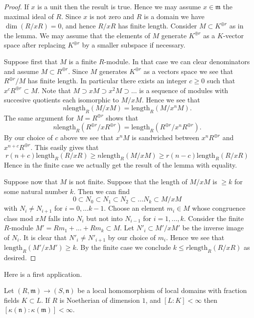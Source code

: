 \begin{proof}
If $x$ is a unit then the result is true. Hence we may assume
$x \in \mathfrak m$ the maximal ideal of $R$. Since $x$ is not
zero and $R$ is a domain we have $\dim(R/xR) = 0$, and hence
$R/xR$ has finite length. Consider $M \subset K^{\oplus r}$ as
in the lemma. We may assume that the elements of $M$ generate
$K^{\oplus r}$ as a $K$-vector space after replacing $K^{\oplus r}$
by a smaller subspace if necessary.

\medskip\noindent
Suppose first that $M$ is a finite $R$-module. In that case we can clear
denominators and assume $M \subset R^{\oplus r}$. Since
$M$ generates $K^{\oplus r}$ as a vectors space we see that
$R^{\oplus r}/M$ has finite length. In particular there exists
an integer $c \geq 0$ such that $x^cR^{\oplus r} \subset M$.
Note that $M \supset xM \supset x^2M \supset \ldots$ is a sequence of
modules with succesive quotients each isomorphic to $M/xM$. Hence
we see that
$$
n \text{length}_R(M/xM) = \text{length}_R(M/x^nM).
$$
The same argument for $M = R^{\oplus r}$ shows that
$$
n \text{length}_R(R^{\oplus r}/xR^{\oplus r}) =
\text{length}_R(R^{\oplus r}/x^nR^{\oplus r}).
$$
By our choice of $c$ above we see that $x^nM$ is sandwiched between
$x^n R^{\oplus r}$ and $x^{n + c}R^{\oplus r}$. This easily gives that
$$
r(n + c) \text{length}_R(R/xR)
\geq
n \text{length}_R(M/xM)
\geq
r (n - c) \text{length}_R(R/xR)
$$
Hence in the finite case we actually get the result of the lemma with
equality.

\medskip\noindent
Suppose now that $M$ is not finite. Suppose that the length of $M/xM$ is
$\geq k$ for some natural number $k$. Then we can find
$$
0 \subset N_0 \subset N_1 \subset N_2 \subset \ldots N_k \subset M/xM
$$
with $N_i \not = N_{i + 1}$ for $i = 0, \ldots k - 1$.
Choose an element $m_i \in M$ whose congruence class mod $xM$ falls
into $N_i$ but not into $N_{i - 1}$ for $i = 1, \ldots, k$.
Consider the finite $R$-module $M' = Rm_1 + \ldots + Rm_k \subset M$.
Let $N'_i \subset M'/xM'$ be the inverse image of $N_i$.
It is clear that $N'_i \not =N'_{i + 1}$ by our choice of $m_i$.
Hence we see that $\text{length}_R(M'/xM') \geq k$. By the
finite case we conclude $k \leq r\text{length}_R(R/xR)$
as desired.
\end{proof}

\noindent
Here is a first application.

\begin{lemma}
\label{lemma-finite-extension-residue-fields-dimension-1}
Let $(R, \mathfrak m) \to (S, \mathfrak n)$
be a local homomorphism of local domains
with fraction fields $K \subset L$. If
$R$ is Noetherian of dimension $1$, and $[L : K] < \infty$
then $[\kappa(\mathfrak n) : \kappa(\mathfrak m)] < \infty$.
\end{lemma}

